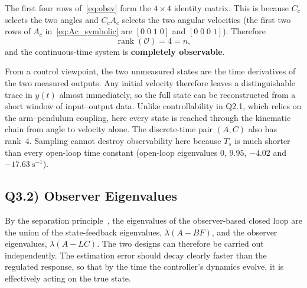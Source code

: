 \documentclass[11pt,a4paper]{article}
\begin{document}
The first four rows of~\eqref{eq:obsv} form the $4\times4$ identity matrix.
This is because $C_c$ selects the two angles and $C_cA_c$ selects the two
angular velocities (the first two rows of $A_c$ in~\eqref{eq:Ac_symbolic} are
$[0\;0\;1\;0]$ and $[0\;0\;0\;1]$). Therefore
\begin{equation}
  \operatorname{rank}(\mathcal{O})=4=n,
\end{equation}
and the continuous-time system is \textbf{completely observable}.

From a control viewpoint, the two unmeasured states are the time derivatives
of the two measured outputs. Any initial velocity therefore leaves a
distinguishable trace in $y(t)$ almost immediately, so the full state can be
reconstructed from a short window of input--output data. Unlike
controllability in Q2.1, which relies on the arm--pendulum coupling, here every
state is reached through the kinematic chain from angle to velocity alone. The
discrete-time pair $(A,C)$ also has rank~4. Sampling cannot destroy
observability here because $T_s$ is much shorter than every open-loop time
constant (open-loop eigenvalues $0$, $9.95$, $-4.02$ and
$-17.63~\mathrm{s^{-1}}$).

\subsection*{Q3.2) Observer Eigenvalues}
By the separation principle~\cite{aguilera2026}, the eigenvalues of the
observer-based closed loop are the union of the state-feedback eigenvalues,
$\lambda(A-BF)$, and the observer eigenvalues, $\lambda(A-LC)$. The two designs
can therefore be carried out independently. The estimation error should decay
clearly faster than the regulated response, so that by the time the
controller's dynamics evolve, it is effectively acting on the true state.
\end{document}
